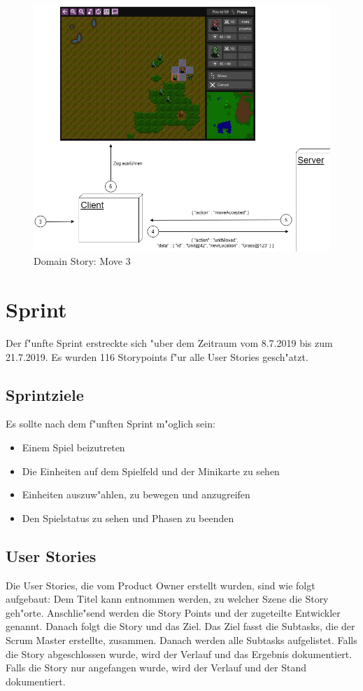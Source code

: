 \documentclass[12pt, titlepage]{scrartcl}
\newcommand{\RN}[1]{%
	\textup{\uppercase\expandafter{\romannumeral#1}}%
}
\begin{document}
		    	\begin{figure}[H] 
		    		\centering
		    		\includegraphics[width=\textwidth]{images/domain_stories/moveStory3.png}
		    		\caption{Domain Story: Move 3}
		    		\label{Domain_Story_Move_3}
		    	\end{figure}
	\newpage
	\section{Sprint \RN{5}}
	    Der f"unfte Sprint erstreckte sich "uber dem Zeitraum vom 8.7.2019 bis zum 21.7.2019. Es wurden 116 Storypoints f"ur alle User Stories gesch"atzt.
	    \subsection{Sprintziele} \label{Sprintgoal_5}
	        Es sollte nach dem f"unften Sprint m"oglich sein:
	        \begin{itemize}
	            \item Einem Spiel beizutreten
	            \item Die Einheiten auf dem Spielfeld und der Minikarte zu sehen
	            \item Einheiten auszuw"ahlen, zu bewegen und anzugreifen
	            \item Den Spielstatus zu sehen und Phasen zu beenden
	        \end{itemize}
	    \subsection{User Stories} \label{User_Stories_5}
	        Die User Stories, die vom Product Owner erstellt wurden, sind wie folgt aufgebaut: Dem Titel kann entnommen werden, zu welcher Szene die Story geh"orte. Anschlie"send werden die Story Points und der zugeteilte Entwickler genannt. Danach folgt die Story und das Ziel. Das Ziel fasst die Subtasks, die der Scrum Master erstellte, zusammen. Danach werden alle Subtasks aufgelistet. Falls die Story abgeschlossen wurde, wird der Verlauf und das Ergebnis dokumentiert. Falls die Story nur angefangen wurde, wird der Verlauf und der Stand dokumentiert.
\end{document}
